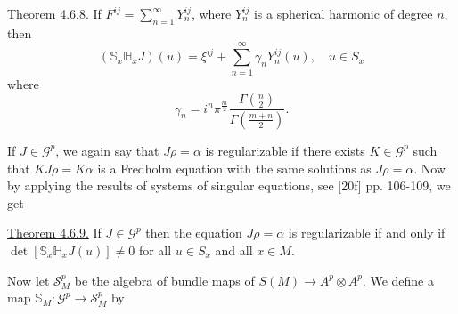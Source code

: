 \uline{Theorem 4.6.8.} If $F^{ij}=\displaystyle\sum_{n=1}^{\infty}Y_n^{ij}$, where $Y_n^{ij}$ is a spherical harmonic of degree $n$, then
\[
(\mathbb S_x\mathbb H_xJ)(u)=\xi^{ij}+\sum_{n=1}^{\infty}\gamma_nY_n^{ij}(u),
\quad u\in S_x
\]
where
\[
\gamma_n=i^n\pi^{\frac m2}\frac{\Gamma(\frac n2)}{\Gamma(\frac{m+n}{2})}.
\]

If $J\in\mathcal G^p$, we again say that $J\rho=\alpha$ is regularizable if there exists $K\in\mathcal G^p$ such that $KJ\rho=K\alpha$ is a Fredholm equation with the same solutions as $J\rho=\alpha$. Now by applying the results of systems of singular equations, see [20f] pp. 106-109, we get

\uline{Theorem 4.6.9.} If $J\in\mathcal G^p$ then the equation $J\rho=\alpha$ is regularizable if and only if
$\det[\mathbb S_x\mathbb H_xJ(u)]\ne0$ for all $u\in S_x$ and all $x\in M$.

Now let $\mathcal S_M^p$ be the algebra of bundle maps of $S(M)\longrightarrow A^p\otimes A^p$. We define a map
$\mathbb S_M:\mathcal G^p\longrightarrow\mathcal S_M^p$ by
